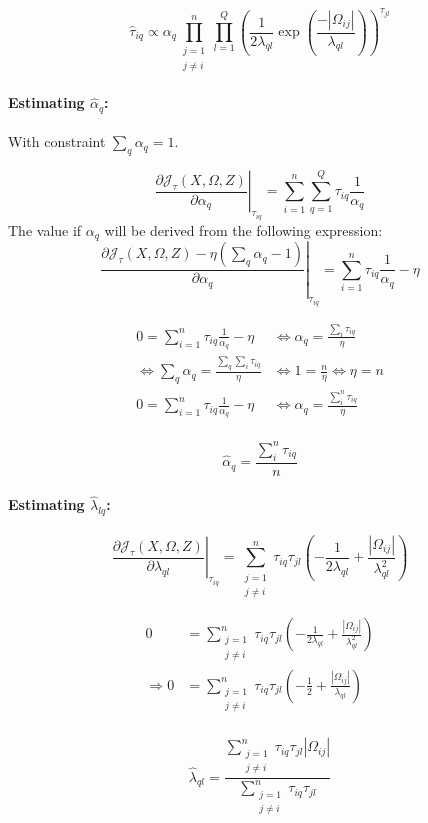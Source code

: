 \documentclass[10pt]{article}
\begin{document}
\[\boxed{\hat{\tau}_{iq} \propto \alpha_q \prod_{\substack{j = 1 \\  j\neq i}}^n \prod_{l = 1}^Q \left( \frac{1}{2\lambda_{ql}} \exp\left(\frac{-|\Omega_{ij}|}{\lambda_{ql}} \right) \right)^{\tau_{jl}}} \]


\paragraph{Estimating $\hat{\alpha}_{q}$:} With constraint $\sum_q \alpha_q = 1$.

\[ \left. \frac{\partial\mathcal{J}_\tau(X, \Omega, Z)}{\partial \alpha_q}  \right| _{\tau_{iq}} = \sum_{i=1}^n \sum_{q = 1}^Q \tau_{iq} \frac{1}{\alpha_q}\]
The value if $\alpha_q$ will be derived from the following expression:
\[ \left. \frac{\partial\mathcal{J}_\tau(X, \Omega, Z)- \eta (\sum_q \alpha_q - 1)}{\partial \alpha_q}  \right| _{\tau_{iq}}  = \sum_{i=1}^n \tau_{iq} \frac{1}{\alpha_q} - \eta  \]

\begin{align*}
0 = \sum_{i=1}^n  \tau_{iq} \frac{1}{\alpha_q} - \eta &\Leftrightarrow \alpha_q  =  \frac{\sum_i \tau_{iq}}{\eta} \\
\Leftrightarrow \sum_q \alpha_q  =  \frac{ \sum_q \sum_i \tau_{iq}}{\eta} &\Leftrightarrow 1  =  \frac{n}{\eta} \Leftrightarrow \boxed{\eta  =  n} \\
0 = \sum_{i=1}^n  \tau_{iq} \frac{1}{\alpha_q} - \eta &\Leftrightarrow \alpha_q  =  \frac{\sum_i^n \tau_{iq}}{\eta} \\
\end{align*}

\[ \boxed{\hat{\alpha}_q  =  \frac{\sum_i^n \tau_{iq}}{n}}\]

\paragraph{Estimating $\hat{\lambda}_{lq}$:}

\[ \left. \frac{\partial\mathcal{J}_\tau(X, \Omega, Z)}{\partial \lambda_{ql}}  \right| _{\tau_{iq}} = \sum_{\substack{j = 1 \\  j\neq i}}^n \tau_{iq}\tau_{jl}\left( -\frac{1}{2\lambda_{ql}} + \frac{|\Omega_{ij}|}{\lambda_{ql}^2}\right)\]

\begin{align*}
0 &=  \sum_{\substack{j = 1 \\  j\neq i}}^n \tau_{iq}\tau_{jl}\left( -\frac{1}{2\lambda_{ql}} + \frac{|\Omega_{ij}|}{\lambda_{ql}^2}\right) \\
\Rightarrow 0	& = \sum_{\substack{j = 1 \\  j\neq i}}^n \tau_{iq}\tau_{jl}\left( -\frac{1}{2} + \frac{|\Omega_{ij}|}{\lambda_{ql}}\right) \\
\end{align*}

\[ \boxed{\hat{\lambda}_{ql} = \frac{\sum_{\substack{j = 1 \\  j\neq i}}^n  \tau_{iq}\tau_{jl} |\Omega_{ij}|}{\sum_{\substack{j = 1 \\  j\neq i}}^n \tau_{iq}\tau_{jl}}   }\]
\end{document}
